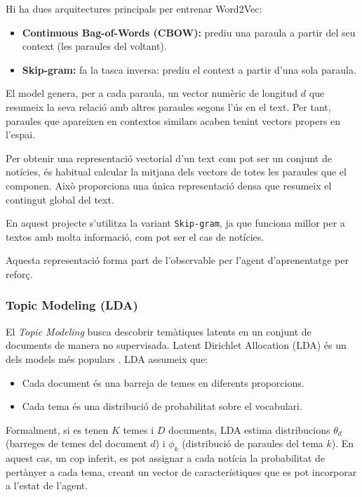 \documentclass[12pt,a4paper,twoside]{book}
\begin{document}
Hi ha dues arquitectures principals per entrenar Word2Vec:

\begin{itemize}
    \item \textbf{Continuous Bag-of-Words (CBOW):} prediu una paraula a partir del seu context (les paraules del voltant).
    \item \textbf{Skip-gram:} fa la tasca inversa: prediu el context a partir d'una sola paraula.
\end{itemize}

El model genera, per a cada paraula, un vector numèric de longitud $d$ que resumeix la seva relació amb altres paraules segons l'ús en el text. Per tant, paraules que apareixen en contextos similars acaben tenint vectors propers en l'espai.

Per obtenir una representació vectorial d'un text com pot ser un conjunt de notícies, és habitual calcular la mitjana dels vectors de totes les paraules que el componen. Això proporciona una única representació densa que resumeix el contingut global del text.

En aquest projecte s'utilitza la variant \texttt{Skip-gram}, ja que funciona millor per a textos amb molta informació, com pot ser el cas de notícies.

Aquesta representació forma part de l'observable per l'agent d'aprenentatge per reforç.


\subsubsection{Topic Modeling (LDA)}

El \emph{Topic Modeling} busca descobrir temàtiques latents en un conjunt de documents de manera no supervisada. Latent Dirichlet Allocation (LDA) és un dels models més populars \cite{Blei2003}. LDA assumeix que:

\begin{itemize}
\item Cada document és una barreja de temes en diferents proporcions.
\item Cada tema és una distribució de probabilitat sobre el vocabulari.
\end{itemize}

Formalment, si es tenen $K$ temes i $D$ documents, LDA estima distribucions $\theta_d$ (barreges de temes del document $d$) i $\phi_k$ (distribució de paraules del tema $k$). En aquest cas, un cop inferit, es pot assignar a cada notícia la probabilitat de pertànyer a cada tema, creant un vector de característiques que es pot incorporar a l'estat de l'agent.
\end{document}
